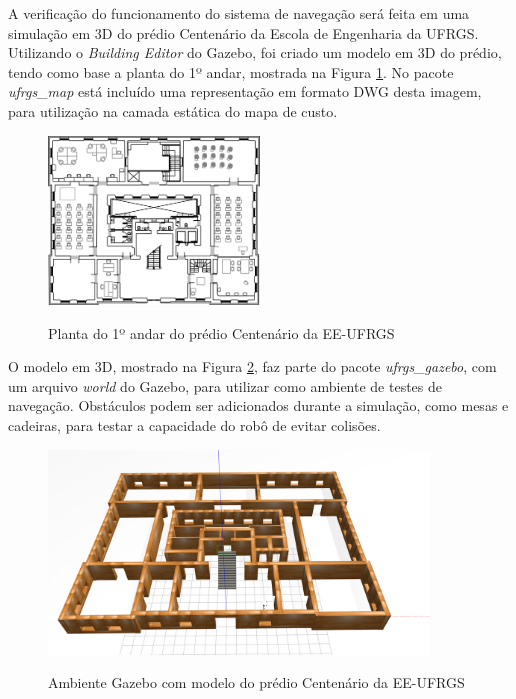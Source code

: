 \documentclass[repeatfields,xlists,xpacks,oneside,yearsonly]{ufrgscca}
\begin{document}
A verificação do funcionamento do sistema de navegação será feita em uma simulação
em 3D do prédio Centenário da Escola de Engenharia da UFRGS.
Utilizando o \textit{Building Editor} do Gazebo, foi criado um modelo em 3D do prédio,
tendo como base a planta do 1º andar, mostrada na Figura \ref{fig:planta_centenario}.
No pacote \textit{ufrgs\_map} está incluído uma representação em formato DWG desta
imagem, para utilização na camada estática do mapa de custo.

\begin{figure}[htbp]
    {
        \centering
        \caption{Planta do 1º andar do prédio Centenário da EE-UFRGS}
        \label{fig:planta_centenario}
        \includegraphics[width=0.5\textwidth]{centenario_floor_plan.png}\\
    }
    {}
\end{figure}

O modelo em 3D, mostrado na Figura \ref{fig:gazebo_centenario}, faz parte do pacote
\textit{ufrgs\_gazebo}, com um arquivo \textit{world} do Gazebo,
para utilizar como ambiente de testes de navegação.
Obstáculos podem ser adicionados durante a simulação, como mesas e cadeiras,
para testar a capacidade do robô de evitar colisões.

\begin{figure}[htbp]
    {
        \centering
        \caption{Ambiente Gazebo com modelo do prédio Centenário da EE-UFRGS}
        \label{fig:gazebo_centenario}
        \includegraphics[width=0.9\textwidth]{gazebo.png}\\
    }
    {}
\end{figure}
\end{document}
